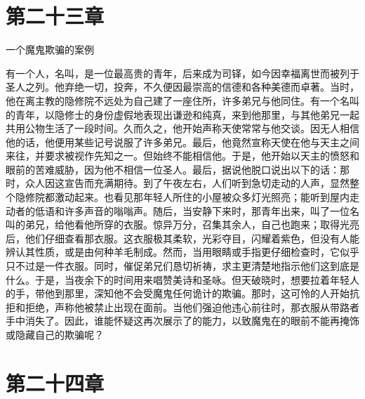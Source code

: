 
\section{第二十三章}

一个魔鬼欺骗的案例\par

有一个人，名叫，是一位最高贵的青年，后来成为司铎，如今因幸福离世而被列于圣人之列。他弃绝一切，投奔，不久便因最崇高的信德和各种美德而卓著。当时，他在离主教的隐修院不远处为自己建了一座住所，许多弟兄与他同住。有一个名叫的青年，以隐修士的身份虚假地表现出谦逊和纯真，来到他那里，与其他弟兄一起共用公物生活了一段时间。久而久之，他开始声称天使常常与他交谈。因无人相信他的话，他便用某些记号说服了许多弟兄。最后，他竟然宣称天使在他与天主之间来往，并要求被视作先知之一。但始终不能相信他。于是，他开始以天主的愤怒和眼前的苦难威胁，因为他不相信一位圣人。最后，据说他脱口说出以下的话：那时，众人因这宣告而充满期待。到了午夜左右，人们听到急切走动的人声，显然整个隐修院都激动起来。也看见那年轻人所住的小屋被众多灯光照亮；能听到屋内走动者的低语和许多声音的嗡嗡声。随后，当安静下来时，那青年出来，叫了一位名叫的弟兄，给他看他所穿的衣服。惊异万分，召集其余人，自己也跑来；取得光亮后，他们仔细查看那衣服。这衣服极其柔软，光彩夺目，闪耀着紫色，但没有人能辨认其性质，或是由何种羊毛制成。然而，当用眼睛或手指更仔细检查时，它似乎只不过是一件衣服。同时，催促弟兄们恳切祈祷，求主更清楚地指示他们这到底是什么。于是，当夜余下的时间用来唱赞美诗和圣咏。但天破晓时，想要拉着年轻人的手，带他到那里，深知他不会受魔鬼任何诡计的欺骗。那时，这可怜的人开始抗拒和拒绝，声称他被禁止出现在面前。当他们强迫他违心前往时，那衣服从带路者手中消失了。因此，谁能怀疑这再次展示了的能力，以致魔鬼在的眼前不能再掩饰或隐藏自己的欺骗呢？\par


\section{第二十四章}

